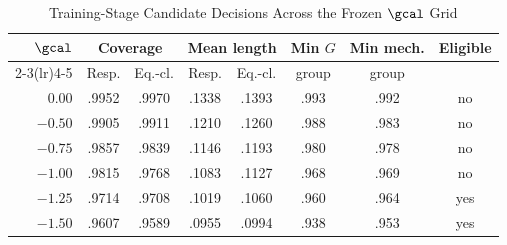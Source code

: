 \begin{table}[H]
\caption{Training-Stage Candidate Decisions Across the Frozen $\gcal$ Grid}
\label{tab:training}
\centering
\small
\begin{tabular}{rccccccc}
\toprule
$\gcal$ & \multicolumn{2}{c}{Coverage} & \multicolumn{2}{c}{Mean length} & Min $G$ & Min mech. & Eligible \\
\cmidrule(lr){2-3}\cmidrule(lr){4-5}
 & Resp. & Eq.-cl. & Resp. & Eq.-cl. & group & group & \\
\midrule
$0.00$ & .9952 & .9970 & .1338 & .1393 & .993 & .992 & no \\
$-0.50$ & .9905 & .9911 & .1210 & .1260 & .988 & .983 & no \\
$-0.75$ & .9857 & .9839 & .1146 & .1193 & .980 & .978 & no \\
$-1.00$ & .9815 & .9768 & .1083 & .1127 & .968 & .969 & no \\
$-1.25$ & .9714 & .9708 & .1019 & .1060 & .960 & .964 & yes \\
$-1.50$ & .9607 & .9589 & .0955 & .0994 & .938 & .953 & yes \\
\bottomrule
\end{tabular}
\end{table}

